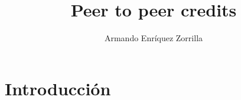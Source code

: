 \documentclass[12pt, fleqn, letterpaper, oneside]{amsart}
\title[Finanzas y Desarrollo]
	  {Peer to peer credits}
\author{Armando Enríquez Zorrilla}
\date{}
\begin{document}
\maketitle

\section{Introducción}
\end{document}
